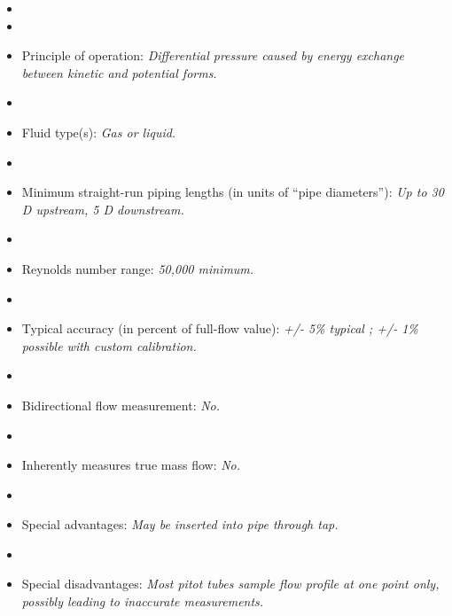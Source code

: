 \documentclass[12pt,a4paper]{article}
\begin{document}
\begin{itemize}
\goodbreak
\item{} 
\vskip 5pt
\item\item{} Principle of operation: {\it Differential pressure caused by energy exchange between kinetic and potential forms.}
\vskip 5pt
\item\item{} Fluid type(s): {\it Gas or liquid.}
\vskip 5pt
\item\item{} Minimum straight-run piping lengths (in units of ``pipe diameters''): {\it Up to 30 D upstream, 5 D downstream.}
\vskip 5pt
\item\item{} Reynolds number range: {\it 50,000 minimum.}
\vskip 5pt
\item\item{} Typical accuracy (in percent of full-flow value): {\it +/- 5\% typical ; +/- 1\% possible with custom calibration.}
\vskip 5pt
\item\item{} Bidirectional flow measurement: {\it No.}
\vskip 5pt
\item\item{} Inherently measures true mass flow: {\it No.}
\vskip 5pt
\item\item{} Special advantages: {\it May be inserted into pipe through tap.}
\vskip 5pt
\item\item{} Special disadvantages: {\it Most pitot tubes sample flow profile at one point only, possibly leading to inaccurate measurements.}
\end{itemize}
\end{document}
